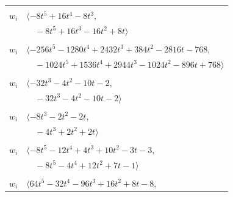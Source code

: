 \documentclass[11pt]{article}
\begin{document}
\begin{longtable}{@{}ll@{}}
\addlinespace[2pt]
\multicolumn{2}{@{}p{0.97\textwidth}@{}}{$i=10$, $D_i=4$, $\rho_{ij}$: $3{:}2, \allowbreak 18{:}2, \allowbreak 19{:}1, \allowbreak 27{:}2, \allowbreak 40{:}1$}\\
$w_i$ & $\langle -8t^{5}+16t^{4}-8t^{3},$\\
 & $\quad -8t^{5}+16t^{3}-16t^{2}+8t\rangle$\\
\addlinespace[2pt]
\multicolumn{2}{@{}p{0.97\textwidth}@{}}{$i=11$, $D_i=128$, $\rho_{ij}$: $1{:}1, \allowbreak 7{:}2, \allowbreak 17{:}2, \allowbreak 21{:}2, \allowbreak 22{:}1, \allowbreak 25{:}1, \allowbreak 42{:}2$}\\
$w_i$ & $\langle -256t^{5}-1280t^{4}+2432t^{3}+384t^{2}-2816t-768,$\\
 & $\quad -1024t^{5}+1536t^{4}+2944t^{3}-1024t^{2}-896t+768\rangle$\\
\addlinespace[2pt]
\multicolumn{2}{@{}p{0.97\textwidth}@{}}{$i=12$, $D_i=4$, $\rho_{ij}$: $1{:}1, \allowbreak 2{:}1, \allowbreak 6{:}1, \allowbreak 18{:}2, \allowbreak 22{:}2, \allowbreak 24{:}1, \allowbreak 32{:}2, \allowbreak 35{:}1, \allowbreak 38{:}1, \allowbreak 46{:}1$}\\
$w_i$ & $\langle -32t^{3}-4t^{2}-10t-2,$\\
 & $\quad -32t^{3}-4t^{2}-10t-2\rangle$\\
\addlinespace[2pt]
\multicolumn{2}{@{}p{0.97\textwidth}@{}}{$i=13$, $D_i=2$, $\rho_{ij}$: $2{:}1, \allowbreak 8{:}2, \allowbreak 27{:}1, \allowbreak 31{:}2, \allowbreak 44{:}1$}\\
$w_i$ & $\langle -8t^{3}-2t^{2}-2t,$\\
 & $\quad -4t^{3}+2t^{2}+2t\rangle$\\
\addlinespace[2pt]
\multicolumn{2}{@{}p{0.97\textwidth}@{}}{$i=14$, $D_i=4$, $\rho_{ij}$: $1{:}2, \allowbreak 2{:}1, \allowbreak 3{:}2, \allowbreak 18{:}1, \allowbreak 22{:}2, \allowbreak 24{:}1, \allowbreak 26{:}2, \allowbreak 27{:}1, \allowbreak 29{:}2, \allowbreak 30{:}2, \allowbreak 46{:}1$}\\
$w_i$ & $\langle -8t^{5}-12t^{4}+4t^{3}+10t^{2}-3t-3,$\\
 & $\quad -8t^{5}-4t^{4}+12t^{2}+7t-1\rangle$\\
\addlinespace[2pt]
\multicolumn{2}{@{}p{0.97\textwidth}@{}}{$i=15$, $D_i=16$, $\rho_{ij}$: $0{:}2, \allowbreak 1{:}2, \allowbreak 4{:}1, \allowbreak 19{:}2, \allowbreak 24{:}1, \allowbreak 33{:}1, \allowbreak 39{:}2$}\\
$w_i$ & $\langle 64t^{5}-32t^{4}-96t^{3}+16t^{2}+8t-8,$\\

\end{longtable}
\end{document}
